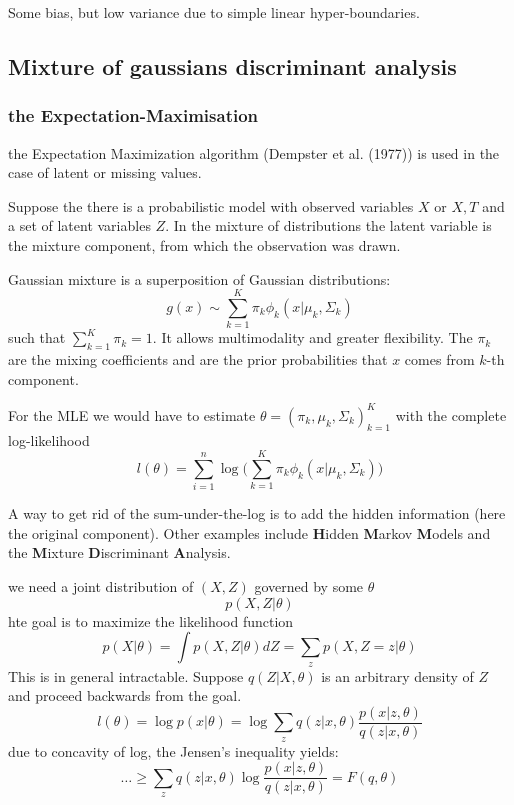\documentclass[a4paper]{article}
\begin{document}
Some bias, but low variance due to simple linear hyper-boundaries.




\subsection{Mixture of gaussians discriminant analysis} %
\label{sub:mixture_of_gaussians_discriminant_analysis}

\subsubsection{the Expectation-Maximisation} %
\label{ssub:the_expectation_maximisation}

the Expectation Maximization algorithm (Dempster et al. (1977)) is used in the case of latent or missing values.

Suppose the there is a probabilistic model with observed variables $X$ or $X,T$ and a set of latent variables $Z$.
In the mixture of distributions the latent variable is the mixture component, from which the observation was drawn.

Gaussian mixture is a superposition of Gaussian distributions:
\[g(x) \sim \sum_{k=1}^K \pi_k \phi_k(x\vert \mu_k, \Sigma_k)\]
such that $\sum_{k=1}^K \pi_k = 1$. It allows multimodality and greater flexibility.
The $\pi_k$ are the mixing coefficients and are the prior probabilities that $x$ comes from $k$-th component.

For the MLE we would have to estimate $\theta=(\pi_k,\mu_k,\Sigma_k)_{k=1}^K$ with the complete log-likelihood
\[l(\theta) = \sum_{i=1}^n \log \big(\sum_{k=1}^K\pi_k \phi_k(x\vert \mu_k, \Sigma_k)\big)\]

A way to get rid of the sum-under-the-log is to add the hidden information (here the original component).
Other examples include \textbf{H}idden \textbf{M}arkov \textbf{M}odels and the \textbf{M}ixture \textbf{D}iscriminant \textbf{A}nalysis.

we need a joint distribution of $(X,Z)$ governed by some $\theta$
\[p(X, Z\vert \theta)\]
hte goal is to maximize the likelihood function
\[p(X\vert \theta) = \int p(X, Z\vert \theta) dZ = \sum_{z} p(X, Z=z\vert \theta) \]
This is in general intractable.
Suppose $q(Z\vert X,\theta)$ is an arbitrary density of $Z$ and proceed backwards from the goal.
\[l(\theta) = \log p(x\vert \theta) = \log \sum_z q(z\vert x,\theta) \frac{p(x\vert z, \theta)}{q(z\vert x,\theta)} \]
due to concavity of log, the Jensen's inequality yields:
\[\ldots \geq \sum_z q(z\vert x,\theta) \log \frac{p(x\vert z, \theta)}{q(z\vert x,\theta)} = F(q,\theta) \]
\end{document}
